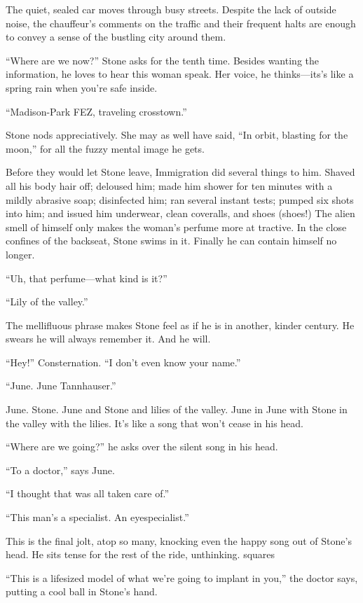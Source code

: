 The quiet, sealed car moves through busy streets. Despite the lack of outside noise, the chauffeur’s comments on the traffic and their frequent halts are enough to convey a sense of the bustling city around them.

“Where are we now?” Stone asks for the tenth time. Besides wanting the information, he loves to hear this woman speak. Her voice, he thinks—its’s like a spring rain when you’re safe inside.

“Madison-Park FEZ, traveling crosstown.”

Stone nods appreciatively. She may as well have said, “In orbit, blasting for the moon,” for all the fuzzy mental image he gets.

Before they would let Stone leave, Immigration did several things to him. Shaved all his body hair off; deloused him; made him shower for ten minutes with a mildly abrasive soap; disinfected him; ran several instant tests; pumped six shots into him; and issued him underwear, clean coveralls, and shoes (shoes!) The alien smell of himself only makes the woman’s perfume more at tractive. In the close confines of the backseat, Stone swims in it. Finally he can contain himself no longer.

“Uh, that perfume—what kind is it?”

“Lily of the valley.”

The mellifluous phrase makes Stone feel as if he is in another, kinder century. He swears he will always remember it. And he will.

“Hey!” Consternation. “I don’t even know your name.”

“June. June Tannhauser.”

June. Stone. June and Stone and lilies of the valley. June in June with Stone in the valley with the lilies. It’s like a song that won’t cease in his head.

“Where are we going?” he asks over the silent song in his head.

“To a doctor,” says June.

“I thought that was all taken care of.”

“This man’s a specialist. An eyespecialist.”

This is the final jolt, atop so many, knocking even the happy song out of Stone’s head. He sits tense for the rest of the ride, unthinking.
squares

“This is a lifesized model of what we’re going to implant in you,” the doctor says, putting a cool ball in Stone’s hand.

